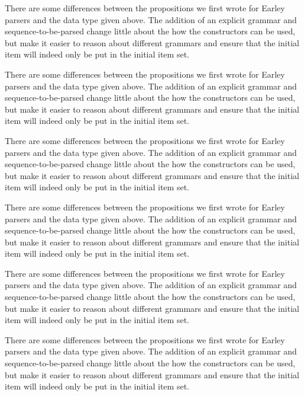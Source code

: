 		There are some differences between the propositions we first wrote for
		Earley parsers and the data type given above. The addition of an
		explicit grammar and sequence-to-be-parsed change little about the how
		the constructors can be used, but make it easier to reason about
		different grammars and ensure that the initial item will indeed only be
		put in the initial item set.

		There are some differences between the propositions we first wrote for
		Earley parsers and the data type given above. The addition of an
		explicit grammar and sequence-to-be-parsed change little about the how
		the constructors can be used, but make it easier to reason about
		different grammars and ensure that the initial item will indeed only be
		put in the initial item set.

		There are some differences between the propositions we first wrote for
		Earley parsers and the data type given above. The addition of an
		explicit grammar and sequence-to-be-parsed change little about the how
		the constructors can be used, but make it easier to reason about
		different grammars and ensure that the initial item will indeed only be
		put in the initial item set.

		\newpage

		There are some differences between the propositions we first wrote for
		Earley parsers and the data type given above. The addition of an
		explicit grammar and sequence-to-be-parsed change little about the how
		the constructors can be used, but make it easier to reason about
		different grammars and ensure that the initial item will indeed only be
		put in the initial item set.

		There are some differences between the propositions we first wrote for
		Earley parsers and the data type given above. The addition of an
		explicit grammar and sequence-to-be-parsed change little about the how
		the constructors can be used, but make it easier to reason about
		different grammars and ensure that the initial item will indeed only be
		put in the initial item set.

		There are some differences between the propositions we first wrote for
		Earley parsers and the data type given above. The addition of an
		explicit grammar and sequence-to-be-parsed change little about the how
		the constructors can be used, but make it easier to reason about
		different grammars and ensure that the initial item will indeed only be
		put in the initial item set.

